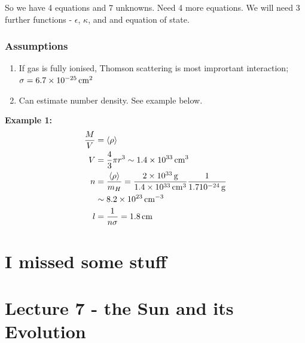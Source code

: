 \documentclass[a4paper]{article} %
\newcommand{\example}[2]
{
\begin{framed}
\textbf{Example #1:} #2
\end{framed}
}
\begin{document}
So we have 4 equations and 7 unknowns. Need 4 more equations. We will need 3 further functions - $\epsilon$, $\kappa$, and and equation of state.

\subsubsection{Assumptions}
\begin{enumerate}
\item If gas is fully ionised, Thomson scattering is most imprortant interaction; $\sigma=6.7\times\SI{d-25}{cm^2}$
\item Can estimate number density. See example below.
\end{enumerate}

\example{1}{
\begin{align*}
\frac{M}{V}&=\langle \rho \rangle\\
V&=\frac{4}{3}\pi r^3\sim 1.4\times \SI{d33}{cm^3}\\
n&=\frac{\langle \rho \rangle}{m_H}=\frac{\SI{2d33}{g}}{1.4\times\SI{d33}{cm^3}}\frac{1}{1.7\SI{d-24}{g}}\\
&\sim 8.2\times \SI{d23}{cm^{-3}}\\
l&=\frac{1}{n\sigma}=\SI{1.8}{cm}
\end{align*}
}


\section{I missed some stuff}

\section{Lecture 7 - the Sun and its Evolution}

\pagebreak

\end{document}
